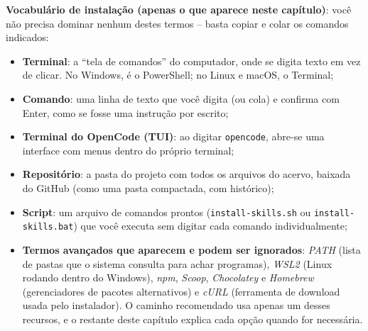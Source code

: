 \begin{conceitochave}
\textbf{Vocabul{\'a}rio de instala{\c c}{\~a}o (apenas o que aparece neste cap{\'i}tulo)}: voc{\^e} n{\~a}o precisa dominar nenhum destes termos -- basta copiar e colar os comandos indicados:
\begin{itemize}
  \item \textbf{Terminal}: a ``tela de comandos'' do computador, onde se digita texto em vez de clicar. No Windows, {\'e} o PowerShell; no Linux e macOS, o Terminal;
  \item \textbf{Comando}: uma linha de texto que voc{\^e} digita (ou cola) e confirma com Enter, como se fosse uma instru{\c c}{\~a}o por escrito;
  \item \textbf{Terminal do OpenCode (TUI)}: ao digitar \texttt{opencode}, abre-se uma interface com menus dentro do pr{\'o}prio terminal;
  \item \textbf{Reposit{\'o}rio}: a pasta do projeto com todos os arquivos do acervo, baixada do GitHub (como uma pasta compactada, com hist{\'o}rico);
  \item \textbf{Script}: um arquivo de comandos prontos (\texttt{install-skills.sh} ou \texttt{install-skills.bat}) que voc{\^e} executa sem digitar cada comando individualmente;
  \item \textbf{Termos avan{\c c}ados que aparecem e podem ser ignorados}: \emph{PATH} (lista de pastas que o sistema consulta para achar programas), \emph{WSL2} (Linux rodando dentro do Windows), \emph{npm}, \emph{Scoop}, \emph{Chocolatey} e \emph{Homebrew} (gerenciadores de pacotes alternativos) e \emph{cURL} (ferramenta de download usada pelo instalador). O caminho recomendado usa apenas um desses recursos, e o restante deste cap{\'i}tulo explica cada op{\c c}{\~a}o quando for necess{\'a}ria.
\end{itemize}
\end{conceitochave}

